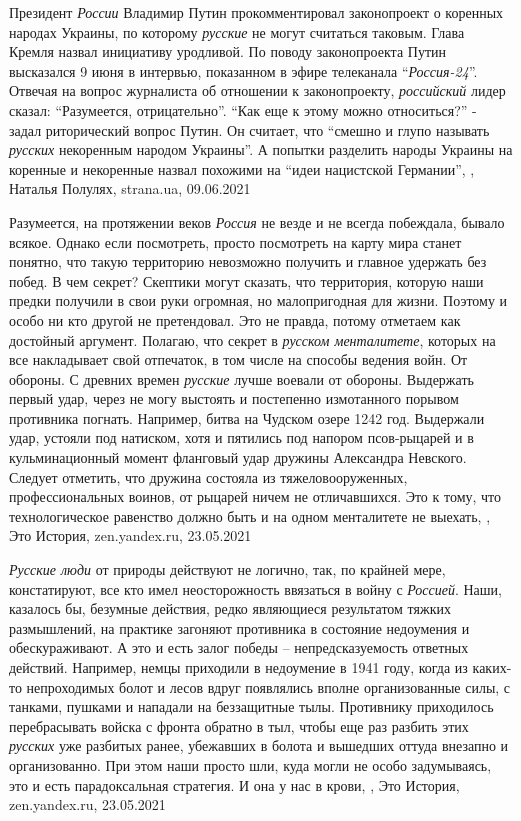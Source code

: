 Президент \emph{России} Владимир Путин прокомментировал законопроект о коренных
народах Украины, по которому \emph{русские} не могут считаться таковым. Глава Кремля
назвал инициативу уродливой.  По поводу законопроекта Путин высказался 9 июня в
интервью, показанном в эфире телеканала \enquote{\emph{Россия-24}}.  Отвечая на вопрос
журналиста об отношении к законопроекту, \emph{российский} лидер сказал: \enquote{Разумеется,
отрицательно}.  \enquote{Как еще к этому можно относиться?} - задал риторический вопрос
Путин.  Он считает, что \enquote{смешно и глупо называть \emph{русских} некоренным народом
Украины}. А попытки разделить народы Украины на коренные и некоренные назвал
похожими на \enquote{идеи нацистской Германии},
, Наталья Полулях, strana.ua, 09.06.2021

Разумеется, на протяжении веков \emph{Россия} не везде и не всегда побеждала, бывало
всякое. Однако если посмотреть, просто посмотреть на карту мира станет понятно,
что такую территорию невозможно получить и главное удержать без побед.  В чем
секрет?  Скептики могут сказать, что территория, которую наши предки получили в
свои руки огромная, но малопригодная для жизни. Поэтому и особо ни кто другой
не претендовал. Это не правда, потому отметаем как достойный аргумент.
Полагаю, что секрет в \emph{русском менталитете}, которых на все накладывает свой
отпечаток, в том числе на способы ведения войн.  От обороны. С древних времен
\emph{русские} лучше воевали от обороны. Выдержать первый удар, через не могу выстоять
и постепенно измотанного порывом противника погнать.  Например, битва на
Чудском озере 1242 год. Выдержали удар, устояли под натиском, хотя и пятились
под напором псов-рыцарей и в кульминационный момент фланговый удар дружины
Александра Невского. Следует отметить, что дружина состояла из
тяжеловооруженных, профессиональных воинов, от рыцарей ничем не отличавшихся.
Это к тому, что технологическое равенство должно быть и на одном менталитете не
выехать,
, Это История, zen.yandex.ru, 23.05.2021

\emph{Русские люди} от природы действуют не логично, так, по крайней мере,
констатируют, все кто имел неосторожность ввязаться в войну с \emph{Россией}. Наши,
казалось бы, безумные действия, редко являющиеся результатом тяжких
размышлений, на практике загоняют противника в состояние недоумения и
обескураживают. А это и есть залог победы – непредсказуемость ответных
действий.  Например, немцы приходили в недоумение в 1941 году, когда из
каких-то непроходимых болот и лесов вдруг появлялись вполне организованные
силы, с танками, пушками и нападали на беззащитные тылы. Противнику приходилось
перебрасывать войска с фронта обратно в тыл, чтобы еще раз разбить этих \emph{русских}
уже разбитых ранее, убежавших в болота и вышедших оттуда внезапно и
организованно. При этом наши просто шли, куда могли не особо задумываясь, это и
есть парадоксальная стратегия. И она у нас в крови,
, Это История, zen.yandex.ru, 23.05.2021

